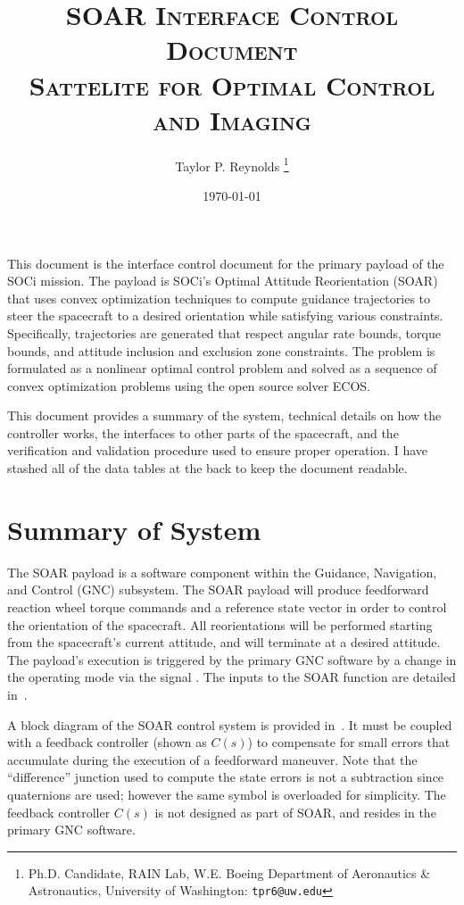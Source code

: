 \documentclass[10pt]{article}
\title{\textsc{SOAR Interface Control Document \\ {\small \textbf{S}attelite for \textbf{O}ptimal \textbf{C}ontrol and \textbf{I}maging}}}
\author{
  Taylor P. Reynolds%
  \thanks{Ph.D. Candidate, RAIN Lab, W.E. Boeing Department of Aeronautics \& Astronautics, University of Washington: \texttt{tpr6@uw.edu} } }
\date{\today}
\begin{document}
 
\maketitle

This document is the interface control document for the primary payload of the SOCi mission. The payload is SOCi's Optimal Attitude Reorientation (SOAR) that uses convex optimization techniques to compute guidance trajectories to steer the spacecraft to a desired orientation while satisfying various constraints. Specifically, trajectories are generated that respect angular rate bounds, torque bounds, and attitude inclusion and exclusion zone constraints. The problem is formulated as a nonlinear optimal control problem and solved as a sequence of convex optimization problems using the open source solver ECOS.

This document provides a summary of the system, technical details on how the controller works, the interfaces to other parts of the spacecraft, and the verification and validation procedure used to ensure proper operation. I have stashed all of the data tables at the back to keep the document readable.

\section{Summary of System}\label{sec:summary}

The SOAR payload is a software component within the Guidance, Navigation, and Control (GNC) subsystem. The SOAR payload will produce feedforward reaction wheel torque commands and a reference state vector in order to control the orientation of the spacecraft. All reorientations will be performed starting from the spacecraft’s current attitude, and will terminate at a desired attitude. The payload's execution is triggered by the primary GNC software by a change in the operating mode via the signal . The inputs to the SOAR function are detailed in~.

A block diagram of the SOAR control system is provided in~. It must be coupled with a feedback controller (shown as $C(s)$) to compensate for small errors that accumulate during the execution of a feedforward maneuver. Note that the ``difference'' junction used to compute the state errors is not a subtraction since quaternions are used; however the same symbol is overloaded for simplicity. The feedback controller $C(s)$ is not designed as part of SOAR, and resides in the primary GNC software.
\end{document}
